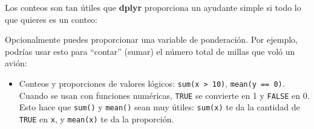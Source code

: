 \documentclass[11pt,oneside]{report}
\newenvironment{Shaded}{\begin{snugshade}}{\end{snugshade}}
\newcommand{\CommentTok}[1]{\textcolor[rgb]{0.56,0.35,0.01}{\textit{#1}}}
\newcommand{\DataTypeTok}[1]{\textcolor[rgb]{0.13,0.29,0.53}{#1}}
\newcommand{\KeywordTok}[1]{\textcolor[rgb]{0.13,0.29,0.53}{\textbf{#1}}}
\newcommand{\NormalTok}[1]{#1}
\newcommand{\OperatorTok}[1]{\textcolor[rgb]{0.81,0.36,0.00}{\textbf{#1}}}
\newcommand{\StringTok}[1]{\textcolor[rgb]{0.31,0.60,0.02}{#1}}
\providecommand{\tightlist}{%
  \setlength{\itemsep}{0pt}\setlength{\parskip}{0pt}}
\begin{document}
Los conteos son tan útiles que \textbf{dplyr} proporciona un ayudante
simple si todo lo que quieres es un conteo:

\begin{Shaded}
\end{Shaded}

Opcionalmente puedes proporcionar una variable de ponderación. Por
ejemplo, podrías usar esto para ``contar'' (sumar) el número total de
millas que voló un avión:

\begin{Shaded}
\end{Shaded}

\begin{itemize}
\tightlist
\item
  Conteos y proporciones de valores lógicos:
  \texttt{sum(x\ \textgreater{}\ 10)}, \texttt{mean(y\ ==\ 0)}. Cuando
  se usan con funciones numéricas, \texttt{TRUE} se convierte en 1 y
  \texttt{FALSE} en 0. Esto hace que \texttt{sum()} y \texttt{mean()}
  sean muy útiles: \texttt{sum(x)} te da la cantidad de \texttt{TRUE} en
  \texttt{x}, y \texttt{mean(x)} te da la proporción.
\end{itemize}
\end{document}
